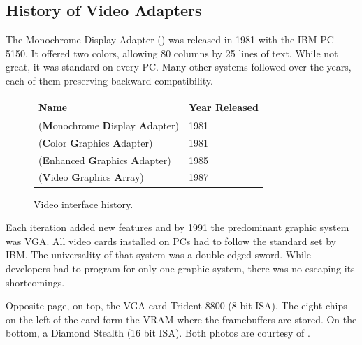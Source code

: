 \documentclass[book.tex]{subfiles}
\begin{document}
  \subsection{History of Video Adapters}

The Monochrome Display Adapter () was released in 1981 with the IBM PC 5150. It offered two colors, allowing 80 columns by 25 lines of text.  While not great, it was standard on every PC. Many other systems followed over the years, each of them preserving backward compatibility.
\bigskip
  
 \begin{figure}[H]
\centering  
\begin{tabularx}{\textwidth}{ X  Y }
  \toprule
  \textbf{Name} &  \textbf{Year Released} \\
  \toprule {}
   (\textbf{M}onochrome
   \textbf{D}isplay
   \textbf{A}dapter) & 1981 
   \\ 
   (\textbf{C}olor
   \textbf{G}raphics
   \textbf{A}dapter) & 1981 
    \\ 
   (\textbf{E}nhanced
   \textbf{G}raphics
   \textbf{A}dapter) & 1985
   \\ 
   (\textbf{V}ideo
   \textbf{G}raphics
   \textbf{A}rray)  & 1987
    \\
  \toprule
\end{tabularx}
\caption{Video interface history.}\label{fig:vga_history}
\end{figure}

Each iteration added new features and by 1991 the predominant graphic system was VGA. All video cards installed on PCs had to follow the standard set by IBM. The universality of that system was a double-edged sword. While developers had to program for only one graphic system, there was no escaping its shortcomings.\\
\par
Opposite page, on top, the VGA card Trident 8800 (8 bit ISA). The eight chips on the left of the card form the VRAM where the framebuffers are stored\protect\footnotemark. On the bottom, a Diamond Stealth (16 bit ISA). Both photos are courtesy of .
\pagebreak

\begin{figure}[H] 
  \centering 
  
\end{figure}
\par
\begin{figure}[H] 
  \centering 
\end{figure}
\pagebreak
\end{document}
